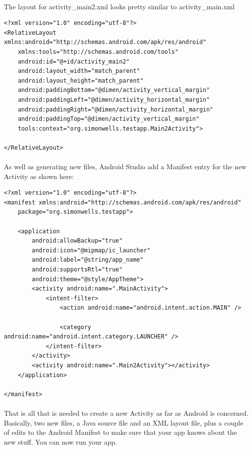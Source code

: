 \paragraph{} The layout for activity\_main2.xml looks pretty similar to activity\_main.xml

\begin{lstlisting}
<?xml version="1.0" encoding="utf-8"?>
<RelativeLayout xmlns:android="http://schemas.android.com/apk/res/android"
    xmlns:tools="http://schemas.android.com/tools"
    android:id="@+id/activity_main2"
    android:layout_width="match_parent"
    android:layout_height="match_parent"
    android:paddingBottom="@dimen/activity_vertical_margin"
    android:paddingLeft="@dimen/activity_horizontal_margin"
    android:paddingRight="@dimen/activity_horizontal_margin"
    android:paddingTop="@dimen/activity_vertical_margin"
    tools:context="org.simonwells.testapp.Main2Activity">

</RelativeLayout>

\end{lstlisting}

\paragraph{} As well as generating new files, Android Studio add a Manifest entry for the new Activity as shown here:

\begin{lstlisting}
<?xml version="1.0" encoding="utf-8"?>
<manifest xmlns:android="http://schemas.android.com/apk/res/android"
    package="org.simonwells.testapp">

    <application
        android:allowBackup="true"
        android:icon="@mipmap/ic_launcher"
        android:label="@string/app_name"
        android:supportsRtl="true"
        android:theme="@style/AppTheme">
        <activity android:name=".MainActivity">
            <intent-filter>
                <action android:name="android.intent.action.MAIN" />

                <category android:name="android.intent.category.LAUNCHER" />
            </intent-filter>
        </activity>
        <activity android:name=".Main2Activity"></activity>
    </application>

</manifest>
\end{lstlisting}


\paragraph{} That is all that is needed to create a new Activity as far as Android is concerned. Basically, two new files, a Java source file and an XML layout file, plus a couple of edits to the Android Manifest to make sure that your app knows about the new stuff. You can now run your app.

